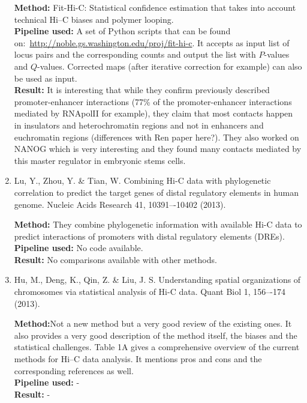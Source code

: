 \documentclass[a4paper,12pt]{article}
\begin{document}
\begin{enumerate}
    \textbf{Method:} Fit-Hi-C: Statistical confidence estimation that takes into account technical Hi--C biases and polymer looping. \\
	\textbf{Pipeline used:} A set of Python scripts that can be found on:~\url{http://noble.gs.washington.edu/proj/fit-hi-c}. It accepts as input list of locus pairs and the corresponding counts and output the list with $P$-values and $Q$-values. Corrected maps (after iterative correction for example) can also be used as input.\\
	\textbf{Result:} It is interesting that while they confirm previously described promoter-enhancer interactions (77\% of the promoter-enhancer interactions mediated by RNApolII for example), they claim that most contacts happen in insulators and heterochromatin regions and not in enhancers and euchromatin regions (differences with Ren paper here?). They also worked
	on NANOG which is very interesting and they found many contacts mediated by this
	master regulator in embryonic stems cells.\\

	\item Lu, Y., Zhou, Y. \& Tian, W. Combining Hi-C data with phylogenetic correlation to predict the target genes of distal regulatory elements in human genome. Nucleic Acids Research 41, 10391–-10402 (2013).

    
    \textbf{Method:} They combine phylogenetic information with available Hi-C data to predict interactions of promoters with distal regulatory elements (DREs).\\
	\textbf{Pipeline used:} No code available.\\
	\textbf{Result:} No comparisons available with other methods.\\

	\item Hu, M., Deng, K., Qin, Z. \& Liu, J. S. Understanding spatial organizations of chromosomes via statistical analysis of Hi-C data. Quant Biol 1, 156–-174 (2013).
    
    \textbf{Method:}Not a new method but a very good review of the existing
    ones. It also provides a very good description of the method itself, the biases and the statistical challenges. Table 1A gives a comprehensive overview of the current methods for Hi--C data analysis. It mentions pros and cons and
    the corresponding references as well.\\
	\textbf{Pipeline used:} - \\
    \textbf{Result:} - \\


\end{enumerate}
\end{document}
